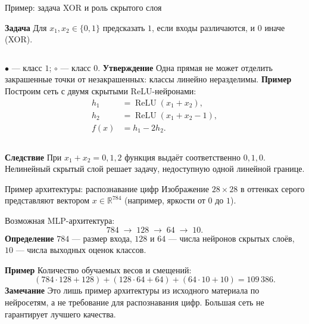 \documentclass[10pt]{beamer}
\newcommand{\mlBody}{\normalsize}
\newcommand{\mlDefinition}{\textcolor{defblue}{\bfseries Определение}}
\newcommand{\mlStatement}{\textcolor{defblue}{\bfseries Утверждение}}
\newcommand{\mlRemark}{\textcolor{defblue}{\bfseries Замечание}}
\newcommand{\mlConsequence}{\textcolor{defblue}{\bfseries Следствие}}
\newcommand{\mlTask}{\textcolor{defblue}{\bfseries Задача}}
\newcommand{\mlExample}{\textcolor{defblue}{\bfseries Пример}}
\begin{document}
\begin{frame}{Пример: задача XOR и роль скрытого слоя}

\mlBody
\mlTask\; Для $x_1,x_2\in\{0,1\}$ предсказать $1$, если входы различаются, и $0$ иначе (XOR).
\begin{columns}[c,onlytextwidth]
    \centering
    \par\smallskip
    {\small \textcolor{defblue}{$\bullet$} --- класс $1$; $\circ$ --- класс $0$.}
    \mlStatement\; Одна прямая не может отделить закрашенные точки от незакрашенных: классы линейно неразделимы.
    \vspace{0.18cm}
    \mlExample\; Построим сеть с двумя скрытыми ReLU-нейронами:
    \[
      \begin{aligned}
       h_1&=\operatorname{ReLU}(x_1+x_2),\\
       h_2&=\operatorname{ReLU}(x_1+x_2-1),\\
       f(x)&=h_1-2h_2.
      \end{aligned}
    \]
\end{columns}
\mlConsequence\; При $x_1+x_2=0,1,2$ функция выдаёт соответственно $0,1,0$. Нелинейный скрытый слой решает задачу, недоступную одной линейной границе.
\end{frame}

\begin{frame}{Пример архитектуры: распознавание цифр}
\mlBody
Изображение $28\times28$ в оттенках серого представляют вектором $x\in\mathbb R^{784}$ (например, яркости от $0$ до $1$).

Возможная MLP-архитектура:
\[
 \boxed{784\;\longrightarrow\;128\;\longrightarrow\;64\;\longrightarrow\;10}.
\]
\mlDefinition\; $784$ --- размер входа, $128$ и $64$ --- числа нейронов скрытых слоёв, $10$ --- числа выходных оценок классов.

\mlExample\; Количество обучаемых весов и смещений:
\[
 (784\cdot128+128)+(128\cdot64+64)+(64\cdot10+10)
 =109\,386.
\]
\mlRemark\; Это лишь пример архитектуры из исходного материала по нейросетям, а не требование для распознавания цифр. Большая сеть не гарантирует лучшего качества.
\end{frame}
\end{document}
